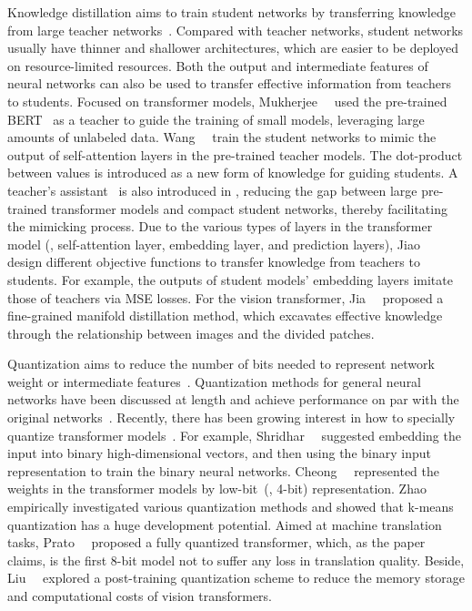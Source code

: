 Knowledge distillation aims to train student networks by transferring knowledge from large teacher networks~. Compared  with teacher networks, student networks usually have thinner and shallower architectures, which  are easier to be deployed on resource-limited resources. 
Both the output and  intermediate features of  neural networks can also be used to transfer effective information from teachers  to students. Focused on  transformer models, Mukherjee~\etal~ used the pre-trained BERT~ as a teacher to guide the training  of small models, leveraging large amounts of unlabeled data.  Wang~\etal~  train the student networks to mimic the output of self-attention layers in the pre-trained teacher models. The dot-product between values is introduced as a new form of knowledge for guiding  students. A teacher's assistant~ is also introduced in , reducing the gap between  large pre-trained transformer models and compact student networks, thereby facilitating the mimicking process. Due to the various types of layers in the transformer model (\ie, self-attention layer, embedding layer, and prediction layers),  Jiao~\etal~ design different objective functions to transfer knowledge from teachers to students. For example, the outputs of student models' embedding layers  imitate those of teachers via MSE losses.  For the vision transformer, Jia~\etal~ proposed a fine-grained manifold distillation method, which excavates effective knowledge through the relationship between images and the
divided patches.

Quantization aims to reduce the number of bits needed to represent network weight or intermediate features~. 
Quantization methods for general neural networks have been discussed at length and achieve  performance on par with the original networks~. Recently, there has been growing interest in how to specially quantize transformer models~. For example, Shridhar~\etal~ suggested embedding the input into binary high-dimensional vectors, and then using the binary input representation to train the binary neural networks. 
Cheong~\etal~ represented the weights in the transformer models by low-bit~(\eg, 4-bit) representation. 
Zhao~\etal~ empirically investigated various quantization methods and showed that k-means quantization has a huge development potential. Aimed at machine translation tasks, Prato~\etal~ proposed a fully quantized transformer, which, as the paper claims, is the first 8-bit model not to suffer any loss in translation quality. Beside, Liu~\etal~ explored a post-training quantization scheme to reduce the memory storage and computational costs of vision transformers.

